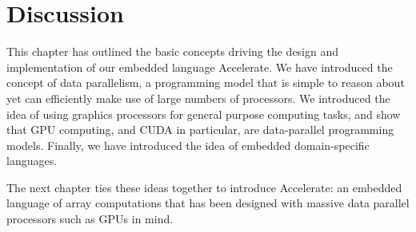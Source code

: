 \section{Discussion}

This chapter has outlined the basic concepts driving the design and
implementation of our embedded language Accelerate. We have introduced the
concept of data parallelism, a programming model that is simple to reason about
yet can efficiently make use of large numbers of processors. We introduced the
idea of using graphics processors for general purpose computing tasks, and show
that GPU computing, and CUDA in particular, are data-parallel programming
models. Finally, we have introduced the idea of embedded domain-specific
languages.

The next chapter ties these ideas together to introduce Accelerate: an embedded
language of array computations that has been designed with massive data parallel
processors such as GPUs in mind.


